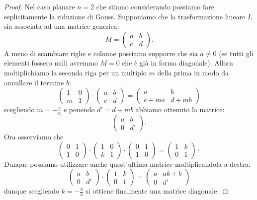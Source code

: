 \begin{proof}
Nel caso planare $n=2$ che stiamo considerando possiamo fare esplicitamente la riduzione di Gauss. Supponiamo che la trasformazione lineare $L$ sia associata ad una matrice generica:
\[
  M = \begin{pmatrix} a&b\\c&d\end{pmatrix}.
\]
A meno di scambiare righe e colonne possiamo supporre che sia $a\neq 0$ (se tutti gli elementi fossero nulli avremmo $M=0$ che è già in forma diagonale). Allora moltiplichiamo la seconda riga per un multiplo $m$ della prima in modo da annullare il termine $b$:
\[
\begin{pmatrix} 1&0\\m&1\end{pmatrix}\cdot
    \begin{pmatrix} a&b\\c&d\end{pmatrix}
  =
  \begin{pmatrix} a&b\\c+ma&d+mb\end{pmatrix}
\]
scegliendo $m=-\frac c a$
e ponendo $d'=d+mb$
abbiamo ottenuto la matrice:
\[
\begin{pmatrix} a&b\\0&d'\end{pmatrix}.
\]
Ora osserviamo che
\[
      \begin{pmatrix} 0&1\\1&0\end{pmatrix}\cdot
      \begin{pmatrix} 1&0\\k&1\end{pmatrix}\cdot
      \begin{pmatrix} 0&1\\1&0\end{pmatrix}
      =
      \begin{pmatrix} 1&k\\0&1\end{pmatrix}\cdot
\]
Dunque possiamo utilizzare anche quest'ultima matrice
moltiplicandola a destra:
\[
\begin{pmatrix} a&b\\0&d'\end{pmatrix}\cdot
  \begin{pmatrix} 1&k\\0&1\end{pmatrix}
  =
  \begin{pmatrix} a&ak+b\\0&d'\end{pmatrix}
\]
dunque scegliendo $k=-\frac b a$ si ottiene finalmente
una matrice diagonale.
\end{proof}

